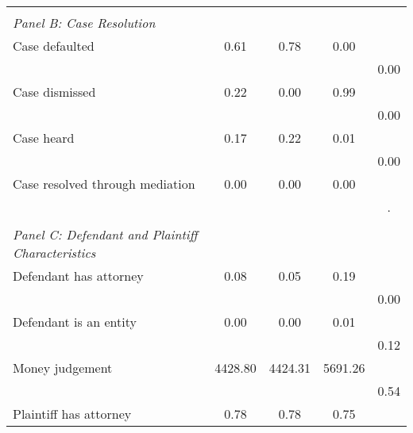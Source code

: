 {\begin{tabular}{l*{4}{c}}
\vspace{0.1em} \\ \emph{Panel B: Case Resolution}&            &            &            &            \\
\hspace{0.25cm}Case defaulted&        0.61&        0.78&        0.00&            \\
                    &            &            &            &        0.00\\
\hspace{0.25cm}Case dismissed&        0.22&        0.00&        0.99&            \\
                    &            &            &            &        0.00\\
\hspace{0.25cm}Case heard&        0.17&        0.22&        0.01&            \\
                    &            &            &            &        0.00\\
\hspace{0.25cm}Case resolved through mediation&        0.00&        0.00&        0.00&            \\
                    &            &            &            &           .\\
\vspace{0.1em} \\ \emph{Panel C: Defendant and Plaintiff Characteristics}&            &            &            &            \\
\hspace{0.25cm}Defendant has attorney&        0.08&        0.05&        0.19&            \\
                    &            &            &            &        0.00\\
\hspace{0.25cm}Defendant is an entity&        0.00&        0.00&        0.01&            \\
                    &            &            &            &        0.12\\
\hspace{0.25cm}Money judgement&     4428.80&     4424.31&     5691.26&            \\
                    &            &            &            &        0.54\\
\hspace{0.25cm}Plaintiff has attorney&        0.78&        0.78&        0.75&            \\

\end{tabular}}
